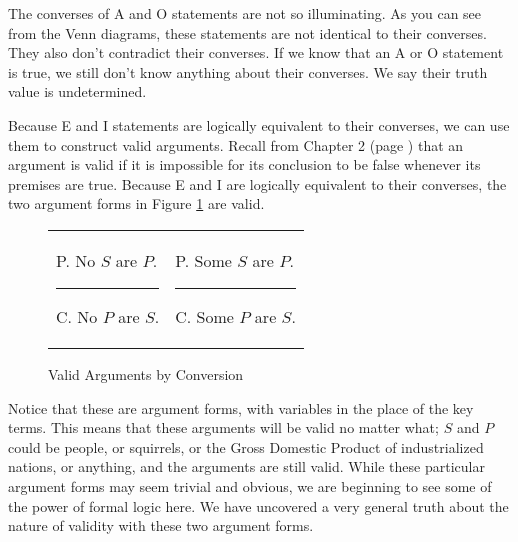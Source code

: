 The converses of A and O statements are not so illuminating. As you can see from the Venn diagrams, these statements are not identical to their converses. They also don't contradict their converses. If we know that an A or O statement is true, we still don't know anything about their converses. We say their truth value is undetermined. 

Because E and I statements are logically equivalent to their converses, we can use them to construct valid arguments. Recall from Chapter 2 (page \pageref{def:valid}) that an argument is valid if it is impossible for its conclusion to be false whenever its premises are true. Because E and I are logically equivalent to their converses, the two argument forms in Figure \ref{fig:conversion_arguments} are valid. 


\begin{figure}
\begin{mdframed}[style=mytablebox]
\begin{tabu}{p{.5\linewidth}p{.5\linewidth}}

\begin{earg}
\item[P.] No $S$ are $P$.
\vspace{-.5em}
\item [] \rule{0.6\linewidth}{1pt} 
\item[C.] No $P$ are $S$.
\end{earg} 

&

\begin{earg}
\item[P.] Some $S$ are $P$.
\vspace{-.5em}
\item [] \rule{0.6\linewidth}{1pt} 
\item[C.] Some  $P$ are $S$.
\end{earg} 
\end{tabu}
\end{mdframed}
\caption{Valid Arguments by Conversion} \label{fig:conversion_arguments}
\end{figure}

Notice that these are argument forms, with variables in the place of the key terms. This means that these arguments will be valid no matter what; $S$ and $P$ could be people, or squirrels, or the Gross Domestic Product of industrialized nations, or anything, and the arguments are still valid. While these particular argument forms may seem trivial and obvious, we are beginning to see some of the power of formal logic here. We have uncovered a very general truth about the nature of validity with these two argument forms. 

